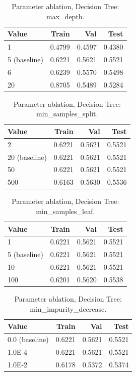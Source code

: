 \begin{table}[ht]
\centering
\small
\caption{Parameter ablation, Decision Tree: max\_depth.}
\label{tab:ablation-tree-max-depth}
\begin{tabular}{lrrr}
\toprule
Value & Train & Val & Test \\
\midrule
1 & 0.4799 & 0.4597 & 0.4380 \\
5 (baseline) & 0.6221 & 0.5621 & 0.5521 \\
6 & 0.6239 & 0.5570 & 0.5498 \\
20 & 0.8705 & 0.5489 & 0.5284 \\
\bottomrule
\end{tabular}
\end{table}

\begin{table}[ht]
\centering
\small
\caption{Parameter ablation, Decision Tree: min\_samples\_split.}
\label{tab:ablation-tree-min-samples-split}
\begin{tabular}{lrrr}
\toprule
Value & Train & Val & Test \\
\midrule
2 & 0.6221 & 0.5621 & 0.5521 \\
20 (baseline) & 0.6221 & 0.5621 & 0.5521 \\
50 & 0.6221 & 0.5621 & 0.5521 \\
500 & 0.6163 & 0.5630 & 0.5536 \\
\bottomrule
\end{tabular}
\end{table}

\begin{table}[ht]
\centering
\small
\caption{Parameter ablation, Decision Tree: min\_samples\_leaf.}
\label{tab:ablation-tree-min-samples-leaf}
\begin{tabular}{lrrr}
\toprule
Value & Train & Val & Test \\
\midrule
1 & 0.6221 & 0.5621 & 0.5521 \\
5 (baseline) & 0.6221 & 0.5621 & 0.5521 \\
10 & 0.6221 & 0.5621 & 0.5521 \\
100 & 0.6201 & 0.5620 & 0.5538 \\
\bottomrule
\end{tabular}
\end{table}

\begin{table}[ht]
\centering
\small
\caption{Parameter ablation, Decision Tree: min\_impurity\_decrease.}
\label{tab:ablation-tree-min-impurity-decrease}
\begin{tabular}{lrrr}
\toprule
Value & Train & Val & Test \\
\midrule
0.0 (baseline) & 0.6221 & 0.5621 & 0.5521 \\
1.0E-4 & 0.6221 & 0.5621 & 0.5521 \\
1.0E-2 & 0.6178 & 0.5372 & 0.5374 \\
\bottomrule
\end{tabular}
\end{table}

